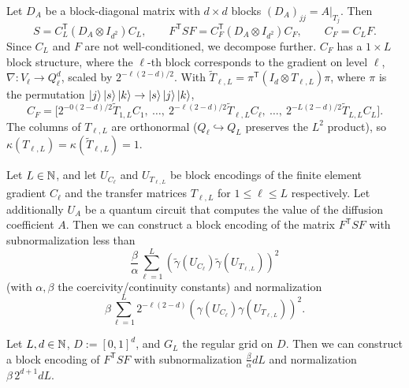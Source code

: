 Let $D_A$ be a block-diagonal matrix with $d \times d$ blocks
$(D_A)_{jj} = A|_{T_j}$. Then
\begin{equation}
  S = C_L^{\mathsf{T}}(D_A \otimes I_{d^2}) C_L, \qquad
  F^{\mathsf{T}} S F = C_F^{\mathsf{T}}(D_A \otimes I_{d^2}) C_F, \qquad C_F = C_L F.
\end{equation}
Since $C_L$ and $F$ are not well-conditioned, we decompose further. $C_F$ has a
$1 \times L$ block structure, where the $\ell$-th block corresponds to the
gradient on level $\ell$, $\nabla : V_\ell \to Q_\ell^d$, scaled by
$2^{-\ell(2-d)/2}$. With $\tilde{T}_{\ell, L} = \pi^{\mathsf{T}}(I_d \otimes T_{\ell, L})\pi$,
where $\pi$ is the permutation $\ket{j}\ket{s}\ket{k} \to \ket{s}\ket{j}\ket{k}$,
\begin{equation}
  C_F = \bigl[2^{-0(2-d)/2}\tilde{T}_{1,L}C_1,\ \dots,\ 2^{-\ell(2-d)/2}\tilde{T}_{\ell,L}C_\ell,\ \dots,\ 2^{-L(2-d)/2}\tilde{T}_{L,L}C_L\bigr].
\end{equation}
The columns of $T_{\ell, L}$ are orthonormal ($Q_\ell \hookrightarrow Q_L$
preserves the $L^2$ product), so $\kappa(T_{\ell, L}) = \kappa(\tilde{T}_{\ell, L}) = 1$.

\begin{theorem}
Let $L \in \mathbb{N}$, and let $U_{C_\ell}$ and $U_{T_{\ell, L}}$ be block encodings of
the finite element gradient $C_\ell$ and the transfer matrices $T_{\ell, L}$ for
$1 \le \ell \le L$ respectively. Let additionally $U_A$ be a quantum circuit that
computes the value of the diffusion coefficient $A$. Then we can construct a block
encoding of the matrix $F^{\mathsf{T}} S F$ with subnormalization less than
\begin{equation}
  \frac{\beta}{\alpha}\sum_{\ell=1}^L (\tilde{\gamma}(U_{C_\ell})\tilde{\gamma}(U_{T_{\ell, L}}))^2
\end{equation}
(with $\alpha, \beta$ the coercivity/continuity constants) and normalization
\begin{equation}
  \beta\sum_{\ell=1}^L 2^{-\ell(2-d)}(\gamma(U_{C_\ell})\gamma(U_{T_{\ell, L}}))^2.
\end{equation}
\end{theorem}

\begin{theorem}
Let $L, d \in \mathbb{N}$, $D := [0,1]^d$, and $G_L$ the regular grid on $D$. Then we can
construct a block encoding of $F^{\mathsf{T}} S F$ with subnormalization
$\tfrac{\beta}{\alpha}dL$ and normalization $\beta\, 2^{d+1}dL$.
\end{theorem}

